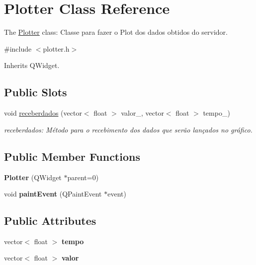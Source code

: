\hypertarget{class_plotter}{}\section{Plotter Class Reference}
\label{class_plotter}


The \hyperlink{class_plotter}{Plotter} class\+: Classe para fazer o Plot dos dados obtidos do servidor.  




{\ttfamily \#include $<$plotter.\+h$>$}



Inherits Q\+Widget.

\subsection*{Public Slots}
\begin{DoxyCompactItemize}
\item 
void \hyperlink{class_plotter_ad8f58fe5e3cc3e18c8c0a61339ad8bc9}{receberdados} (vector$<$ float $>$ valor\+\_\+, vector$<$ float $>$ tempo\+\_\+)
\begin{DoxyCompactList}\small\item\em receberdados\+: Método para o recebimento dos dados que serão lançados no gráfico. \end{DoxyCompactList}\end{DoxyCompactItemize}
\subsection*{Public Member Functions}
\begin{DoxyCompactItemize}
\item 
\mbox{\label{class_plotter_a367b6890c36910a27ec710ac3693e64b}} 
{\bfseries Plotter} (Q\+Widget $\ast$parent=0)
\item 
\mbox{\label{class_plotter_a06477bf987646f000a8982db1352a11d}} 
void {\bfseries paint\+Event} (Q\+Paint\+Event $\ast$event)
\end{DoxyCompactItemize}
\subsection*{Public Attributes}
\begin{DoxyCompactItemize}
\item 
\mbox{\label{class_plotter_a153819a693fb5e8755ff5f76dbdee49f}} 
vector$<$ float $>$ {\bfseries tempo}
\item 
\mbox{\label{class_plotter_ae2b50568c5449ff59745ae10992efbde}} 
vector$<$ float $>$ {\bfseries valor}
\end{DoxyCompactItemize}


